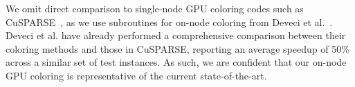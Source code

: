 
We omit direct comparison to single-node GPU coloring codes such as CuSPARSE~\cite{naumov2015parallel}, as we use subroutines for on-node coloring from Deveci et al.~\cite{IAB:deveci2016parallel}. Deveci et al. have already performed a comprehensive comparison between their coloring methods and those in CuSPARSE, reporting an average speedup of 50\% across a similar set of test instances. As such, we are confident that our on-node GPU coloring is representative of the current state-of-the-art.

